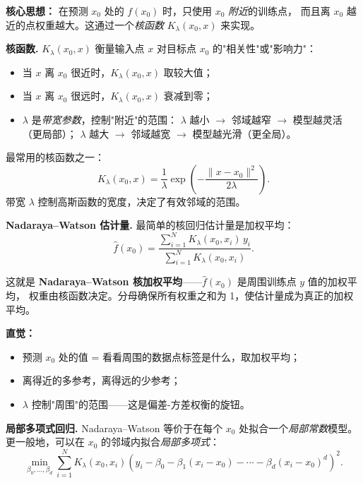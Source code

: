 \textbf{核心思想：} 在预测 $x_0$ 处的 $f(x_0)$ 时，只使用 $x_0$ \emph{附近}的训练点，
而且离 $x_0$ 越近的点权重越大。这通过一个\emph{核函数} $K_\lambda(x_0, x)$ 来实现。

\medskip
\textbf{核函数.} $K_\lambda(x_0, x)$ 衡量输入点 $x$ 对目标点 $x_0$ 的"相关性"或"影响力"：
\begin{itemize}
    \item 当 $x$ 离 $x_0$ 很近时，$K_\lambda(x_0, x)$ 取较大值；
    \item 当 $x$ 离 $x_0$ 很远时，$K_\lambda(x_0, x)$ 衰减到零；
    \item $\lambda$ 是\emph{带宽参数}，控制"附近"的范围：
    $\lambda$ 越小 $\to$ 邻域越窄 $\to$ 模型越灵活（更局部）；
    $\lambda$ 越大 $\to$ 邻域越宽 $\to$ 模型越光滑（更全局）。
\end{itemize}

\begin{example}
最常用的核函数之一：
\begin{equation}\label{eq:gaussian-kernel}
    K_\lambda(x_0, x) = \frac{1}{\lambda} \exp\!\left(-\frac{\|x - x_0\|^2}{2\lambda}\right).
\end{equation}
带宽 $\lambda$ 控制高斯函数的宽度，决定了有效邻域的范围。
\end{example}

\medskip
\textbf{Nadaraya--Watson 估计量.} 最简单的核回归估计量是加权平均：
\begin{equation}\label{eq:nadaraya-watson}
    \boxed{\hat{f}(x_0) = \frac{\sum_{i=1}^{N} K_\lambda(x_0, x_i) \, y_i}
                              {\sum_{i=1}^{N} K_\lambda(x_0, x_i)}}.
\end{equation}

这就是 \textbf{Nadaraya--Watson 核加权平均}——$\hat{f}(x_0)$ 是周围训练点 $y$ 值的加权平均，
权重由核函数决定。分母确保所有权重之和为 1，使估计量成为真正的加权平均。

\textbf{直觉：}
\begin{itemize}
    \item 预测 $x_0$ 处的值 = 看看周围的数据点标签是什么，取加权平均；
    \item 离得近的多参考，离得远的少参考；
    \item $\lambda$ 控制"周围"的范围——这是偏差-方差权衡的旋钮。
\end{itemize}

\medskip
\textbf{局部多项式回归.} Nadaraya--Watson 等价于在每个 $x_0$ 处拟合一个\emph{局部常数}模型。
更一般地，可以在 $x_0$ 的邻域内拟合\emph{局部多项式}：
\begin{equation}
    \min_{\beta_0, \dots, \beta_d} \sum_{i=1}^{N} K_\lambda(x_0, x_i)
    \left(y_i - \beta_0 - \beta_1(x_i - x_0) - \cdots - \beta_d (x_i - x_0)^d\right)^2.
\end{equation}

